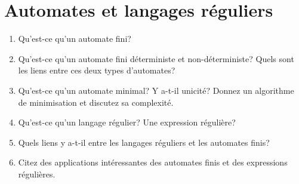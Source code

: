 \documentclass[11pt, a4paper]{article}
\begin{document}
\section{Automates et langages réguliers}

  \begin{enumerate}

    \item Qu'est-ce qu'un automate fini?

    \item Qu'est-ce qu'un automate fini déterministe et
          non-déterministe? Quels sont les liens entre ces deux types
          d'automates?

    \item Qu'est-ce qu'un automate minimal? Y a-t-il unicité? Donnez
          un algorithme de minimisation et discutez sa complexité.

    \item Qu'est-ce qu'un langage régulier? Une expression régulière?

    \item Quels liens y a-t-il entre les langages réguliers et les
          automates finis?

    \item Citez des applications intéressantes des automates finis et
          des expressions régulières.

  \end{enumerate}
\end{document}
